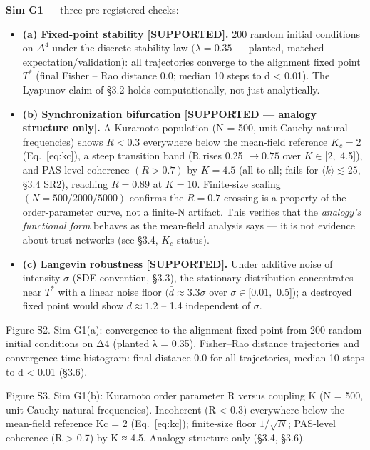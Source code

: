 \documentclass[
]{article}
\begin{document}
\textbf{Sim G1} --- three pre-registered checks:

\begin{itemize}
\item
  \textbf{(a) Fixed-point stability {[}SUPPORTED{]}.} 200 random initial
  conditions on \(\Delta^{4}\) under the discrete stability law
  \((\lambda = 0.35\) --- planted, matched expectation/validation): all
  trajectories converge to the alignment fixed point \(T^{*}\) (final
  Fisher -- Rao distance 0.0; median 10 steps to d \textless{} 0.01).
  The Lyapunov claim of §3.2 holds computationally, not just
  analytically.
\item
  \textbf{(b) Synchronization bifurcation {[}SUPPORTED --- analogy
  structure only{]}.} A Kuramoto population (N = 500, unit-Cauchy
  natural frequencies) shows \(R < 0.3\) everywhere below the mean-field
  reference \(K_c = 2\) (Eq.~{[}eq:kc{]}), a steep transition band (R
  rises 0.25 \(\to 0.75\) over \(K \in [2,\) 4.5{]}), and PAS-level
  coherence \((R > 0.7)\) by \(K = 4.5\) (all-to-all; fails for
  \(\langle k\rangle \lesssim 25\), §3.4 SR2), reaching \(R = 0.89\) at
  \(K = 10.\) Finite-size scaling \((N = 500/2000/5000)\) confirms the
  \(R = 0.7\) crossing is a property of the order-parameter curve, not a
  finite-N artifact. This verifies that the \emph{analogy's functional
  form} behaves as the mean-field analysis says --- it is not evidence
  about trust networks (see §3.4, \(K_c\) status).
\item
  \textbf{(c) Langevin robustness {[}SUPPORTED{]}.} Under additive noise
  of intensity \(\sigma\) (SDE convention, §3.3), the stationary
  distribution concentrates near \(T^{*}\) with a linear noise floor
  \((\bar{d} \approx 3.3\sigma\) over \(\sigma \in [0.01,\) 0.5{]}); a
  destroyed fixed point would show \(\bar{d} \approx 1.2\) -- 1.4
  independent of \(\sigma.\)
\end{itemize}

Figure S2. Sim G1(a): convergence to the alignment fixed point from 200
random initial conditions on {Δ4} (planted {λ = 0.35}). Fisher--Rao
distance trajectories and convergence-time histogram: final distance
{0.0} for all trajectories, median 10 steps to {d \textless{} 0.01}
(§3.6).

Figure S3. Sim G1(b): Kuramoto order parameter {R} versus coupling {K}
({N = 500}, unit-Cauchy natural frequencies). Incoherent
({R \textless{} 0.3}) everywhere below the mean-field reference {Kc = 2}
(Eq.~{[}eq:kc{]}); finite-size floor {\(1/\sqrt{N}\)}; PAS-level
coherence ({R \textgreater{} 0.7}) by {K ≈ 4.5}. Analogy structure only
(§3.4, §3.6).
\end{document}
